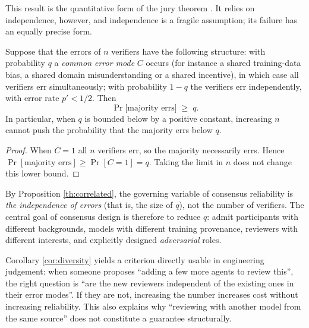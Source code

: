 This result is the quantitative form of the jury theorem \cite{condorcet1785}. It relies on
independence, however, and independence is a fragile assumption; its failure has an equally
precise form.

\begin{proposition}\label{th:correlated}
Suppose that the errors of $n$ verifiers have the following structure: with probability $q$
a \emph{common error mode} $C$ occurs (for instance a shared training-data bias, a shared
domain misunderstanding or a shared incentive), in which case all verifiers err
simultaneously; with probability $1-q$ the verifiers err independently, with error rate
$p' < 1/2$. Then
\begin{equation}\label{eq:correlated}
\Pr\bigl[\text{majority errs}\bigr] \;\ge\; q .
\end{equation}
In particular, when $q$ is bounded below by a positive constant, increasing $n$ cannot push
the probability that the majority errs below $q$.
\end{proposition}

\begin{proof}
When $C = 1$ all $n$ verifiers err, so the majority necessarily errs. Hence
$\Pr[\text{majority errs}] \ge \Pr[C = 1] = q$. Taking the limit in $n$ does not change
this lower bound.
\end{proof}

\begin{corollary}\label{cor:diversity}
By Proposition \ref{th:correlated}, the governing variable of consensus reliability is
\emph{the independence of errors} (that is, the size of $q$), not the number of verifiers.
The central goal of consensus design is therefore to reduce $q$: admit participants with
different backgrounds, models with different training provenance, reviewers with different
interests, and explicitly designed \emph{adversarial} roles.
\end{corollary}

\begin{remark}\label{rmk:diversity-use}
Corollary \ref{cor:diversity} yields a criterion directly usable in engineering judgement:
when someone proposes ``adding a few more agents to review this'', the right question is
``are the new reviewers independent of the existing ones in their error modes''. If they are
not, increasing the number increases cost without increasing reliability. This also explains
why ``reviewing with another model from the same source'' does not constitute a guarantee
structurally.
\end{remark}

